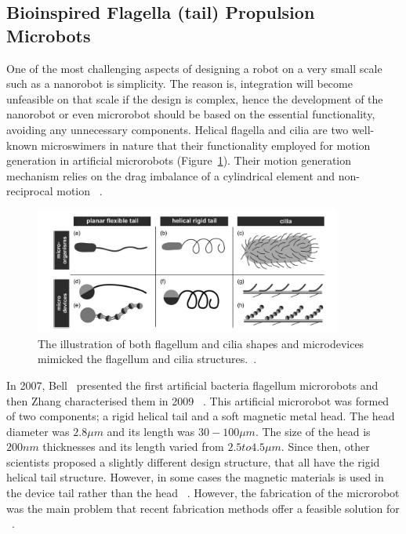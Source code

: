 \documentclass[a4paper,11pt]{article}
\begin{document}
\begin{sloppypar}
\subsection{Bioinspired Flagella (tail) Propulsion Microbots}

One of the most challenging aspects of designing a robot on a very small scale such 
as a nanorobot is simplicity. The reason is, integration will become unfeasible on that
 scale if the design is complex, hence the development of the nanorobot or even microrobot
 should be based on the essential functionality, avoiding any unnecessary components. Helical 
flagella and cilia are two well-known microswimers in nature that their functionality employed for motion 
generation in artificial microrobots  (Figure~\ref{cilia}). Their motion generation mechanism relies on
 the drag imbalance of a cylindrical element and non-reciprocal motion ~\citep{gao2013bioinspired}. 



\begin{figure}
  \centering
    \includegraphics[width=0.9\textwidth]{cilia}
  \caption{The illustration of both flagellum and cilia shapes and microdevices mimicked the flagellum and cilia 
structures.~\citep{peyer2013bio}.}
  \label{cilia}
\end{figure}

In 2007, Bell ~\citep{gao2013bioinspired}presented the first artificial bacteria flagellum microrobots and then
 Zhang characterised them in 2009 ~\citep{gao2013bioinspired}. This artificial microrobot was formed of two 
components; a rigid helical tail and a soft magnetic metal head. The head diameter 
was $2.8 \mu  m$ and its length was $30-100 \mu m$. The size of the head is $200 nm$ thicknesses and its 
length varied from $2.5 to 4.5 \mu m$. Since then, other scientists proposed a slightly different design 
structure, that all have the rigid helical tail structure. However, in some cases the magnetic
 materials is used in the device tail rather than the head ~\citep{gao2013bioinspired}. 
However, the fabrication of the microrobot was the main problem that recent fabrication methods 
offer a feasible solution for ~\citep{gao2013bioinspired}. 


\end{sloppypar}
\end{document}
